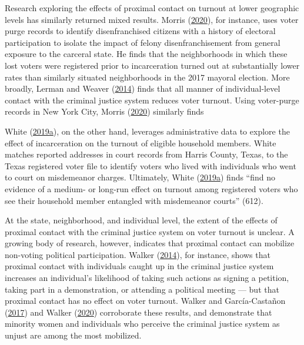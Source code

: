 \documentclass[
  12pt,
]{article}
\begin{document}
Research exploring the effects of proximal contact on turnout at lower geographic levels has similarly returned mixed results. Morris (\protect\hyperlink{ref-Morris2020}{2020}), for instance, uses voter purge records to identify disenfranchised citizens with a history of electoral participation to isolate the impact of felony disenfranchisement from general exposure to the carceral state. He finds that the neighborhoods in which these lost voters were registered prior to incarceration turned out at substantially lower rates than similarly situated neighborhoods in the 2017 mayoral election. More broadly, Lerman and Weaver (\protect\hyperlink{ref-Lerman2014}{2014}) finds that all manner of individual-level contact with the criminal justice system reduces voter turnout. Using voter-purge records in New York City, Morris (\protect\hyperlink{ref-Morris2020}{2020}) similarly finds

White (\protect\hyperlink{ref-White2019a}{2019}\protect\hyperlink{ref-White2019a}{a}), on the other hand, leverages administrative data to explore the effect of incarceration on the turnout of eligible household members. White matches reported addresses in court records from Harris County, Texas, to the Texas registered voter file to identify voters who lived with individuals who went to court on misdemeanor charges. Ultimately, White (\protect\hyperlink{ref-White2019a}{2019}\protect\hyperlink{ref-White2019a}{a}) finds ``find no evidence of a medium- or long-run effect on turnout among registered voters who see their household member entangled with misdemeanor courts'' (612).

At the state, neighborhood, and individual level, the extent of the effects of proximal contact with the criminal justice system on voter turnout is unclear. A growing body of research, however, indicates that proximal contact can mobilize non-voting political participation. Walker (\protect\hyperlink{ref-Walker2014}{2014}), for instance, shows that proximal contact with individuals caught up in the criminal justice system increases an individual's likelihood of taking such actions as signing a petition, taking part in a demonstration, or attending a political meeting --- but that proximal contact has no effect on voter turnout. Walker and García-Castañon (\protect\hyperlink{ref-Walker2017}{2017}) and Walker (\protect\hyperlink{ref-Walker2020}{2020}) corroborate these results, and demonstrate that minority women and individuals who perceive the criminal justice system as unjust are among the most mobilized.
\end{document}
